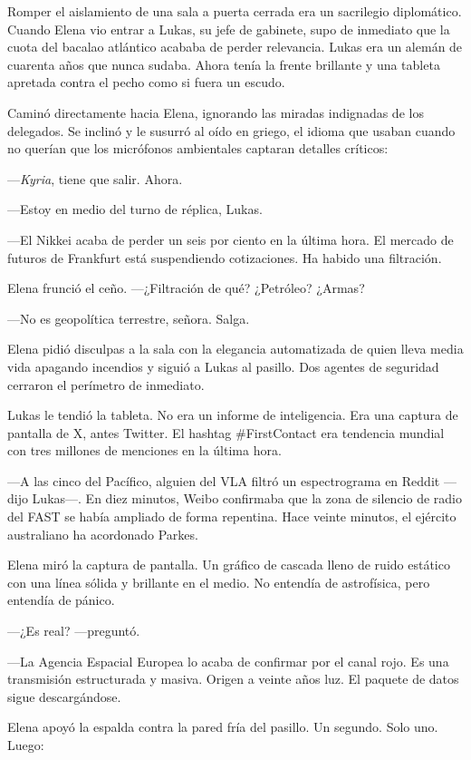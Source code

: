 \documentclass[11pt,a5paper,twoside]{book}
\begin{document}
Romper el aislamiento de una sala a puerta cerrada era un sacrilegio diplomático. Cuando Elena vio entrar a Lukas, su jefe de gabinete, supo de inmediato que la cuota del bacalao atlántico acababa de perder relevancia. Lukas era un alemán de cuarenta años que nunca sudaba. Ahora tenía la frente brillante y una tableta apretada contra el pecho como si fuera un escudo.

Caminó directamente hacia Elena, ignorando las miradas indignadas de los delegados. Se inclinó y le susurró al oído en griego, el idioma que usaban cuando no querían que los micrófonos ambientales captaran detalles críticos:

—\textit{Kyria}, tiene que salir. Ahora.

—Estoy en medio del turno de réplica, Lukas.

—El Nikkei acaba de perder un seis por ciento en la última hora. El mercado de futuros de Frankfurt está suspendiendo cotizaciones. Ha habido una filtración.

Elena frunció el ceño. —¿Filtración de qué? ¿Petróleo? ¿Armas?

—No es geopolítica terrestre, señora. Salga.

Elena pidió disculpas a la sala con la elegancia automatizada de quien lleva media vida apagando incendios y siguió a Lukas al pasillo. Dos agentes de seguridad cerraron el perímetro de inmediato.

Lukas le tendió la tableta. No era un informe de inteligencia. Era una captura de pantalla de X, antes Twitter. El hashtag \#FirstContact era tendencia mundial con tres millones de menciones en la última hora.

—A las cinco del Pacífico, alguien del VLA filtró un espectrograma en Reddit —dijo Lukas—. En diez minutos, Weibo confirmaba que la zona de silencio de radio del FAST se había ampliado de forma repentina. Hace veinte minutos, el ejército australiano ha acordonado Parkes.

Elena miró la captura de pantalla. Un gráfico de cascada lleno de ruido estático con una línea sólida y brillante en el medio. No entendía de astrofísica, pero entendía de pánico.

—¿Es real? —preguntó.

—La Agencia Espacial Europea lo acaba de confirmar por el canal rojo. Es una transmisión estructurada y masiva. Origen a veinte años luz. El paquete de datos sigue descargándose.

Elena apoyó la espalda contra la pared fría del pasillo. Un segundo. Solo uno. Luego:
\end{document}
